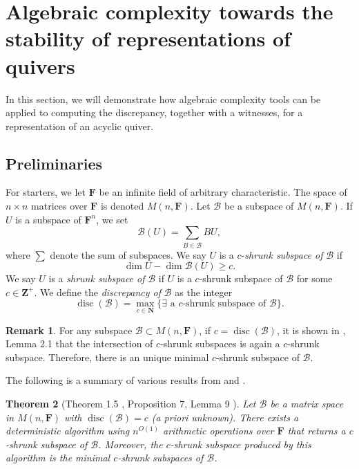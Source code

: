 \documentclass[a4paper]{amsart}
\numberwithin{equation}{section}
\theoremstyle{plain}
\newtheorem{theorem}{Theorem}[section]
\theoremstyle{definition}
\newtheorem{remark}[theorem]{Remark}
\DeclareMathOperator{\disc}{disc}
\begin{document}
\section{Algebraic complexity towards the stability of representations of quivers}\label{appendixB}
In this section, we will demonstrate how algebraic complexity tools can be applied to computing the discrepancy, together with a witnesses, for a representation of an acyclic quiver.
\subsection{Preliminaries}
For starters, we let $\mathbf{F}$ be an infinite field of arbitrary characteristic. The space of $n\times n$ matrices over $\mathbf{F}$ is denoted $M(n,\mathbf{F})$.
Let $\mathcal{B}$ be a subspace of $M(n,\mathbf{F})$. If $U$ is a subspace of $\mathbf{F}^n$, we set $$\mathcal{B}(U)=\sum_{B\in\mathcal{B}}BU,$$ where $\sum$ denote the sum of subspaces.  We say $U$ is a $c$-\emph{shrunk subspace of }$\mathcal{B}$ if $$\dim U-\dim\mathcal{B}(U)\geq c.$$ We say $U$ is a \emph{shrunk subspace of }$\mathcal{B}$ if $U$ is a $c$-shrunk subspace of $\mathcal{B}$ for some $c\in\mathbf{Z}^{+}$. We define the \emph{discrepancy of }$\mathcal{B}$ as the integer  
$$\disc(\mathcal{B})=\max_{c\in\mathbf{N}}\{\exists\text{ a }c\text{-shrunk subspace of }\mathcal{B}\}.$$

\begin{remark}\label{existence_of_minimality_c_shrunk}
For any subspace $\mathcal{B}\subset M(n,\mathbf{F})$, if $c=\disc(\mathcal{B})$, it is shown in \cite{https://doi.org/10.48550/arxiv.2111.00039}, Lemma 2.1 that the intersection of $c$-shrunk subspaces is again a $c$-shrunk subspace. Therefore, there is an unique minimal $c$-shrunk subspace of $\mathcal{B}$.
\end{remark}

The following is a summary of various results from \cite{MR3868734} and \cite{MR3354797} .
\begin{theorem}[Theorem 1.5 \cite{MR3868734}, Proposition 7, Lemma 9 \cite{MR3354797}]\label{thm_1.5_ISQ18}
Let $\mathcal{B}$ be a matrix space in $M(n,\mathbf{F})$ with $\disc(\mathcal{B})=c$ (a priori unknown). There exists a deterministic algorithm using $n^{O(1)}$ arithmetic operations over $\mathbf{F}$ that returns a $c$-shrunk subspace of $\mathcal{B}$. Moreover, the $c$-shrunk subspace produced by this algorithm is the minimal $c$-shrunk subspaces of $\mathcal{B}$.
\end{theorem}
\end{document}
